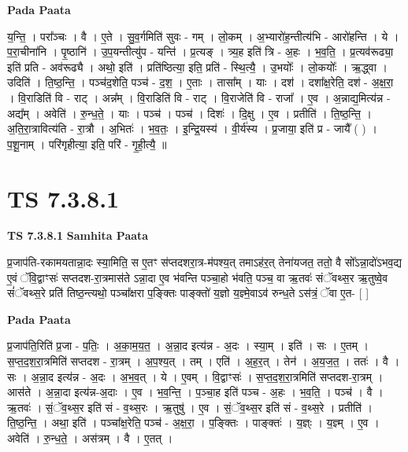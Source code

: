 \documentclass[17pt]{extarticle}
\begin{document}
\textbf{Pada Paata} \newline

य॒न्ति॒ । परा᳚ञ्चः । वै । ए॒ते । सु॒व॒र्गमिति॑ सुवः - गम् । लो॒कम् । अ॒भ्यारो॑ह॒न्तीत्य॑भि - आरो॑हन्ति । ये । प॒रा॒चीना॑नि । पृ॒ष्ठानि॑ । उ॒प॒यन्तीत्यु॑प - यन्ति॑ । प्र॒त्यङ् । त्र्य॒ह इति॑ त्रि - अ॒हः । भ॒व॒ति॒ । प्र॒त्यव॑रूढ्या॒ इति॑ प्रति - अव॑रूढ्यै । अथो॒ इति॑ । प्रति॑ष्ठित्या॒ इति॒ प्रति॑ - स्थि॒त्यै॒ । उ॒भयोः᳚ । लो॒कयोः᳚ । ऋ॒द्ध्वा । उदिति॑ । ति॒ष्ठ॒न्ति॒ । पञ्च॑द॒शेति॒ पञ्च॑ - द॒श॒ । ए॒ताः । तासा᳚म् । याः । दश॑ । दशा᳚क्ष॒रेति॒ दश॑ - अ॒क्ष॒रा॒ । वि॒राडिति॑ वि - राट् । अन्न᳚म् । वि॒राडिति॑ वि - राट् । वि॒राजेति॑ वि - राजा᳚ । ए॒व । अ॒न्नाद्य॒मित्य॑न्न - अद्य᳚म् । अवेति॑ । रु॒न्ध॒ते॒ । याः । पञ्च॑ । पञ्च॑ । दिशः॑ । दि॒क्षु । ए॒व । प्रतीति॑ । ति॒ष्ठ॒न्ति॒ । अ॒ति॒रा॒त्रावित्य॑ति - रा॒त्रौ । अ॒भितः॑ । भ॒व॒तः॒ । इ॒न्द्रि॒यस्य॑ । वी॒र्य॑स्य । प्र॒जाया॒ इति॑ प्र - जायै᳚ ( ) । प॒शू॒नाम् । परि॑गृहीत्या॒ इति॒ परि॑ - गृ॒ही॒त्यै॒ ॥  \newline




\section*{ TS 7.3.8.1 }

\textbf{TS 7.3.8.1 } \newline
\textbf{Samhita Paata} \newline

प्र॒जाप॑ति-रकामयतान्ना॒दः स्या॒मिति॒ स ए॒तꣳ स॑प्तदशरा॒त्र-म॑पश्य॒त् तमाऽह॑र॒त् तेना॑यजत॒ ततो॒ वै सो᳚ऽन्ना॒दो॑ऽभव॒द्य ए॒वं ॅवि॒द्वाꣳसः॑ सप्तदश-रा॒त्रमास॑ते ऽन्ना॒दा ए॒व भ॑वन्ति पञ्चा॒हो भ॑वति॒ पञ्च॒ वा ऋ॒तवः॑ संॅवथ्स॒र ऋ॒तुष्वे॒व सं॑ॅवथ्स॒रे प्रति॑ तिष्ठ॒न्त्यथो॒ पञ्चा᳚क्षरा प॒ङ्क्तिः पाङ्क्तो॑ य॒ज्ञो य॒ज्ञ्मे॒वाऽव॑ रुन्ध॒ते ऽस॑त्रं॒ ॅवा ए॒त- [  ] \newline

\textbf{Pada Paata} \newline

प्र॒जाप॑ति॒रिति॑ प्र॒जा - प॒तिः॒ । अ॒का॒म॒य॒त॒ । अ॒न्ना॒द इत्य॑न्न - अ॒दः । स्या॒म् । इति॑ । सः । ए॒तम् । स॒प्त॒द॒श॒रा॒त्रमिति॑ सप्तदश - रा॒त्रम् । अ॒प॒श्य॒त् । तम् । एति॑ । अ॒ह॒र॒त् । तेन॑ । अ॒य॒ज॒त॒ । ततः॑ । वै । सः । अ॒न्ना॒द इत्य॑न्न - अ॒दः । अ॒भ॒व॒त् । ये । ए॒वम् । वि॒द्वाꣳसः॑ । स॒प्त॒द॒श॒रा॒त्रमिति॑ सप्तदश-रा॒त्रम् । आस॑ते । अ॒न्ना॒दा इत्य॑न्न-अ॒दाः । ए॒व । भ॒व॒न्ति॒ । प॒ञ्चा॒ह इति॑ पञ्च - अ॒हः । भ॒व॒ति॒ । पञ्च॑ । वै । ऋ॒तवः॑ । सं॒ॅव॒थ्स॒र इति॑ सं - व॒थ्स॒रः । ऋ॒तुषु॑ । ए॒व । सं॒ॅव॒थ्स॒र इति॑ सं - व॒थ्स॒रे । प्रतीति॑ । ति॒ष्ठ॒न्ति॒ । अथा॒ इति॑ । पञ्चा᳚क्ष॒रेति॒ पञ्च॑ - अ॒क्ष॒रा॒ । प॒ङ्क्तिः । पाङ्क्तः॑ । य॒ज्ञ्ः । य॒ज्ञ्म् । ए॒व । अवेति॑ । रु॒न्ध॒ते॒ । अस॑त्रम् । वै । ए॒तत् ।  \newline
\end{document}
